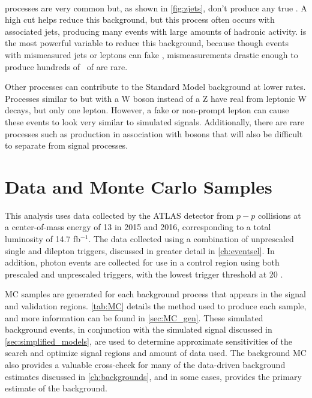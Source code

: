 \paragraph{\dyjets} processes are very common but, as shown in \autoref{fig:zjets}, don't produce any true \MET. A high \HT cut helps reduce this background, but this process often occurs with associated jets, producing many events with large amounts of hadronic activity. \MET is the most powerful variable to reduce this background, because though events with mismeasured jets or leptons can fake \MET, mismeasurements drastic enough to produce hundreds of \gev~of \met are rare. 

Other processes can contribute to the Standard Model background at lower rates. Processes similar to \dyjets but with a W boson instead of a Z have real \MET from leptonic W decays, but only one lepton. However, a fake or non-prompt lepton can cause these events to look very similar to simulated signals. Additionally, there are rare processes such as \ttbar production in association with bosons that will also be difficult to separate from signal processes.

\section{Data and Monte Carlo Samples} 

This analysis uses data collected by the \ac{ATLAS} detector from $p-p$ collisions at a center-of-mass energy of 13 \tev in 2015 and 2016, corresponding to a total luminosity of 14.7 fb$^{-1}$. The data collected using a combination of unprescaled single and dilepton triggers, discussed in greater detail in \autoref{ch:eventsel}. In addition, photon events are collected for use in a control region using both prescaled and unprescaled triggers, with the lowest trigger threshold at 20 \gev. 

\ac{MC} samples are generated for each background process that appears in the signal and validation regions. \autoref{tab:MC} details the method used to produce each sample, and more information can be found in \autoref{sec:MC_gen}. These simulated background events, in conjunction with the simulated signal discussed in \autoref{sec:simplified_models}, are used to determine approximate sensitivities of the search and optimize signal regions and amount of data used. The background \ac{MC} also provides a valuable cross-check for many of the data-driven background estimates discussed in \autoref{ch:backgrounds}, and in some cases, provides the primary estimate of the background.

